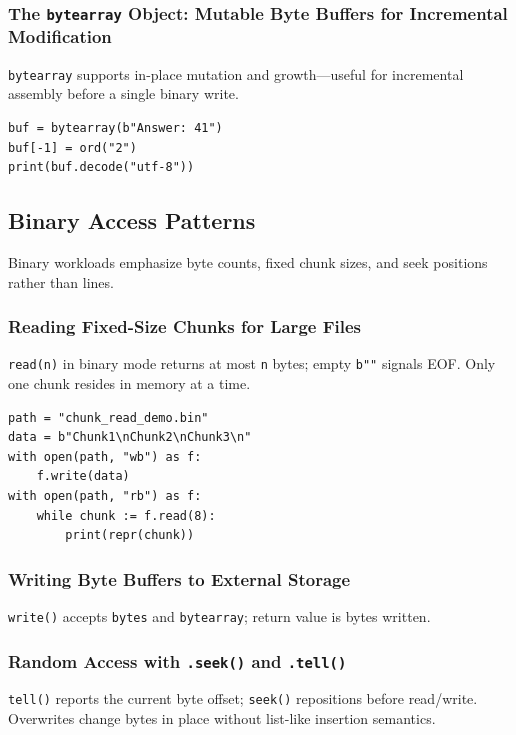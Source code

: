 \documentclass[a4paper,twoside]{report}
\begin{document}
\subsubsection{The \texttt{bytearray} Object: Mutable Byte Buffers for Incremental Modification}

\texttt{bytearray} supports in-place mutation and growth---useful for incremental assembly before a single binary write.

\begin{verbatim}
buf = bytearray(b"Answer: 41")
buf[-1] = ord("2")
print(buf.decode("utf-8"))
\end{verbatim}


\subsection{Binary Access Patterns}

Binary workloads emphasize byte counts, fixed chunk sizes, and seek positions rather than lines.

\subsubsection{Reading Fixed-Size Chunks for Large Files}

\texttt{read(n)} in binary mode returns at most \texttt{n} bytes; empty \texttt{b""} signals EOF. Only one chunk resides in memory at a time.

\begin{verbatim}
path = "chunk_read_demo.bin"
data = b"Chunk1\nChunk2\nChunk3\n"
with open(path, "wb") as f:
    f.write(data)
with open(path, "rb") as f:
    while chunk := f.read(8):
        print(repr(chunk))
\end{verbatim}

\subsubsection{Writing Byte Buffers to External Storage}

\texttt{write()} accepts \texttt{bytes} and \texttt{bytearray}; return value is bytes written.

\subsubsection{Random Access with \texttt{.seek()} and \texttt{.tell()}}

\texttt{tell()} reports the current byte offset; \texttt{seek()} repositions before read/write. Overwrites change bytes in place without list-like insertion semantics.
\end{document}
